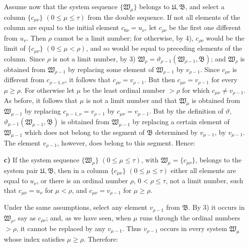 Assume now that the system sequence \(\{\mathfrak W_\mu\}\) belongs to \(\mathfrak U,\mathfrak B\), and select a column \(\{c_{\mu\nu}\}\) \((0\leq\mu\leq\tau)\) from the double sequence. If not all elements of the column are equal to the initial element \(c_{0\nu}=u_\nu\), let \(c_{\rho\nu}\) be the first one different from \(u_\nu\). Then \(\rho\) cannot be a limit number; for otherwise, by 4), \(c_{\rho\nu}\) would be the limit of \(\{c_{\mu\nu}\}\) \((0\leq\mu<\rho)\), and so would be equal to preceding elements of the column. Since \(\rho\) is not a limit number, by 3) \(\mathfrak W_\rho=\vartheta_{\rho-1}(\mathfrak W_{\rho-1},\mathfrak B)\); and \(\mathfrak W_\rho\) is obtained from \(\mathfrak W_{\rho-1}\) by replacing some element of \(\mathfrak W_{\rho-1}\) by \(v_{\rho-1}\). Since \(c_{\rho\nu}\) is different from \(c_{\rho-1,\nu}\), it follows that \(c_{\rho\nu}=v_{\rho-1}\). But then \(c_{\mu\nu}=v_{\rho-1}\) for every \(\mu\geq\rho\). For otherwise let \(\mu\) be the least ordinal number \(>\rho\) for which \(c_{\mu\nu}\neq v_{\rho-1}\). As before, it follows that \(\mu\) is not a limit number and that \(\mathfrak W_\mu\) is obtained from \(\mathfrak W_{\mu-1}\) by replacing \(c_{\mu-1,\nu}=v_{\rho-1}\) by \(c_{\mu\nu}=v_{\mu-1}\). But by the definition of \(\vartheta\), \(\vartheta_{\mu-1}(\mathfrak W_{\mu-1},\mathfrak B)\) is obtained from \(\mathfrak W_{\mu-1}\) by replacing a certain element of \(\mathfrak W_{\mu-1}\) which does not belong to the segment of \(\mathfrak B\) determined by \(v_{\mu-1}\), by \(v_{\mu-1}\). The element \(v_{\rho-1}\), however, does belong to this segment. Hence:

\textbf{c)} If the system sequence \(\{\mathfrak W_\mu\}\) \((0\leq\mu\leq\tau)\), with \(\mathfrak W_\mu=\{c_{\mu\nu}\}\), belongs to the system pair \(\mathfrak U,\mathfrak B\), then in a column \(\{c_{\mu\nu}\}\) \((0\leq\mu\leq\tau)\) either all elements are equal to \(u_\nu\), or there is an ordinal number \(\rho\), \(0<\rho\leq\tau\), not a limit number, such that \(c_{\mu\nu}=u_\nu\) for \(\mu<\rho\), and \(c_{\mu\nu}=v_{\rho-1}\) for \(\mu\geq\rho\).

Under the same assumptions, select any element \(v_{\rho-1}\) from \(\mathfrak B\). By 3) it occurs in \(\mathfrak W_\rho\), say as \(c_{\rho\nu}\); and, as we have seen, when \(\mu\) runs through the ordinal numbers \(>\rho\), it cannot be replaced by any \(v_{\mu-1}\). Thus \(v_{\rho-1}\) occurs in every system \(\mathfrak W_\mu\) whose index satisfies \(\mu\geq\rho\). Therefore:

